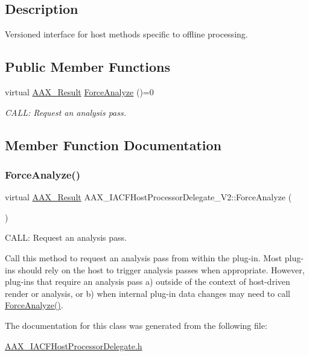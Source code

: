 \subsection{Description}
Versioned interface for host methods specific to offline processing. \subsection*{Public Member Functions}
\begin{DoxyCompactItemize}
\item 
virtual \mbox{\hyperlink{a00392_a4d8f69a697df7f70c3a8e9b8ee130d2f}{A\+A\+X\+\_\+\+Result}} \mbox{\hyperlink{a01705_a4eca04fe742cacbd49f5f32f68c4e3a6}{Force\+Analyze}} ()=0
\begin{DoxyCompactList}\small\item\em C\+A\+LL\+: Request an analysis pass. \end{DoxyCompactList}\end{DoxyCompactItemize}


\subsection{Member Function Documentation}
\mbox{\label{a01705_a4eca04fe742cacbd49f5f32f68c4e3a6}} 
\subsubsection{\texorpdfstring{ForceAnalyze()}{ForceAnalyze()}}
{\footnotesize\ttfamily virtual \mbox{\hyperlink{a00392_a4d8f69a697df7f70c3a8e9b8ee130d2f}{A\+A\+X\+\_\+\+Result}} A\+A\+X\+\_\+\+I\+A\+C\+F\+Host\+Processor\+Delegate\+\_\+\+V2\+::\+Force\+Analyze (\begin{DoxyParamCaption}{ }\end{DoxyParamCaption})\hspace{0.3cm}{\ttfamily [pure virtual]}}



C\+A\+LL\+: Request an analysis pass. 

Call this method to request an analysis pass from within the plug-\/in. Most plug-\/ins should rely on the host to trigger analysis passes when appropriate. However, plug-\/ins that require an analysis pass a) outside of the context of host-\/driven render or analysis, or b) when internal plug-\/in data changes may need to call {\ttfamily \mbox{\hyperlink{a01705_a4eca04fe742cacbd49f5f32f68c4e3a6}{Force\+Analyze()}}}. 

The documentation for this class was generated from the following file\+:\begin{DoxyCompactItemize}
\item 
\mbox{\hyperlink{a00539}{A\+A\+X\+\_\+\+I\+A\+C\+F\+Host\+Processor\+Delegate.\+h}}\end{DoxyCompactItemize}
